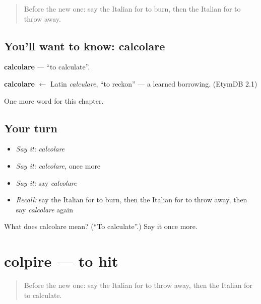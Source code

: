 \label{lesson:IT-C237-calcolare}



\begin{quote}
Before the new one: say the Italian for to burn, then the Italian for to throw away.
\end{quote}

\subsection*{You'll want to know: calcolare}
\textbf{calcolare} — \textquotedblleft{}to calculate\textquotedblright{}.

\begin{cousinweb}
\textbf{calcolare} $\leftarrow$ Latin \emph{calculare}, \textquotedblleft{}to reckon\textquotedblright{} — a learned borrowing. (EtymDB 2.1)
\end{cousinweb}

\begin{grammarlens}[title={What you've built}]
One more word for this chapter.
\end{grammarlens}

\subsection*{Your turn}
\begin{itemize}
\raggedright
  \item \emph{Say it:} \emph{calcolare}
  \item \emph{Say it:} \emph{calcolare}, once more
  \item \emph{Say it:} say \emph{calcolare}
  \item \emph{Recall:} say the Italian for to burn, then the Italian for to throw away, then say \emph{calcolare} again
\end{itemize}

\begin{tcolorbox}[breakable,colback=teal!4,colframe=teal!35!black,title={Before you move on}]
What does calcolare mean? (\textquotedblleft{}To calculate\textquotedblright{}.) Say it once more.
\end{tcolorbox}
\section[colpire]{colpire — to hit}

\label{lesson:IT-C237-colpire}



\begin{quote}
Before the new one: say the Italian for to throw away, then the Italian for to calculate.
\end{quote}

